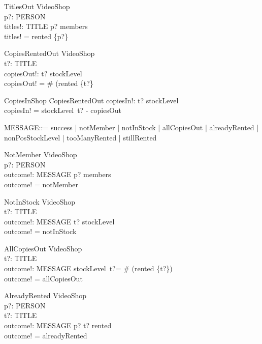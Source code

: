 \documentclass{article}
\begin{document}
\begin{schema}{TitlesOut}
\Xi VideoShop \\
p?: PERSON\\
titles!: \power TITLE
\where
p? \in members \\
titles! = rented \limg \{p?\} \rimg
\end{schema}

\begin{schema}{CopiesRentedOut}
\Xi VideoShop\\
t?: TITLE\\
copiesOut!: \nat
\where
t? \in \dom stockLevel\\
copiesOut! = \# (rented \rres \{t?\}
\end{schema}


\begin{schema}{CopiesInShop}
CopiesRentedOut
copiesIn!: \nat
\where
t? \in \dom stockLevel\\
copiesIn! = stockLevel~t? - copiesOut
\end{schema}

\begin{zed}
MESSAGE::= success | notMember | notInStock | 
allCopiesOut | alreadyRented | nonPosStockLevel | tooManyRented | stillRented
\end{zed}

\begin{schema}{NotMember}
\Xi VideoShop\\
p?: PERSON\\
outcome!: MESSAGE
\where
p? \notin members \\
outcome! = notMember
\end{schema}

\begin{schema}{NotInStock}
\Xi VideoShop\\
t?: TITLE \\
outcome!: MESSAGE
\where
t? \notin \dom stockLevel \\
outcome! = notInStock
\end{schema}

\begin{schema}{AllCopiesOut}
\Xi VideoShop\\
t?: TITLE\\
outcome!: MESSAGE
\where
stockLevel~t?= \# (rented \rres \{t?\})\\
outcome! = allCopiesOut
\end{schema}

\begin{schema}{AlreadyRented}
\Xi VideoShop \\
p?: PERSON \\
t?: TITLE \\
outcome!: MESSAGE
\where
p? \mapsto t? \in rented \\
outcome! = alreadyRented
\end{schema}
\end{document}
